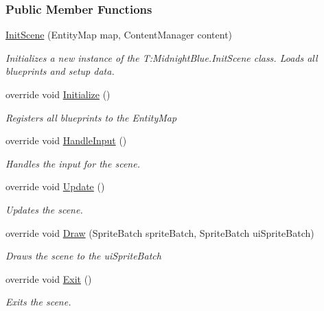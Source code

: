 \subsubsection*{Public Member Functions}
\begin{DoxyCompactItemize}
\item 
\hyperlink{class_midnight_blue_1_1_init_scene_a6458d599d89e074484645974a1975f46}{Init\+Scene} (Entity\+Map map, Content\+Manager content)
\begin{DoxyCompactList}\small\item\em Initializes a new instance of the T\+:\+Midnight\+Blue.\+Init\+Scene class. Loads all blueprints and setup data. \end{DoxyCompactList}\item 
override void \hyperlink{class_midnight_blue_1_1_init_scene_a99eee8cc5dab8d7263591aeaa50144fb}{Initialize} ()
\begin{DoxyCompactList}\small\item\em Registers all blueprints to the Entity\+Map \end{DoxyCompactList}\item 
override void \hyperlink{class_midnight_blue_1_1_init_scene_a4a8d9c22193d334e41685ce62fa11dd9}{Handle\+Input} ()
\begin{DoxyCompactList}\small\item\em Handles the input for the scene. \end{DoxyCompactList}\item 
override void \hyperlink{class_midnight_blue_1_1_init_scene_ad87861fb4f2a30f5168f6133aa10d3f4}{Update} ()
\begin{DoxyCompactList}\small\item\em Updates the scene. \end{DoxyCompactList}\item 
override void \hyperlink{class_midnight_blue_1_1_init_scene_a5d6b21ff45a6c14edcf0bd8318133725}{Draw} (Sprite\+Batch sprite\+Batch, Sprite\+Batch ui\+Sprite\+Batch)
\begin{DoxyCompactList}\small\item\em Draws the scene to the ui\+Sprite\+Batch \end{DoxyCompactList}\item 
override void \hyperlink{class_midnight_blue_1_1_init_scene_a16fc773b06a711e1ba35dda44e3edc3e}{Exit} ()
\begin{DoxyCompactList}\small\item\em Exits the scene. \end{DoxyCompactList}\item 

\end{DoxyCompactItemize}
